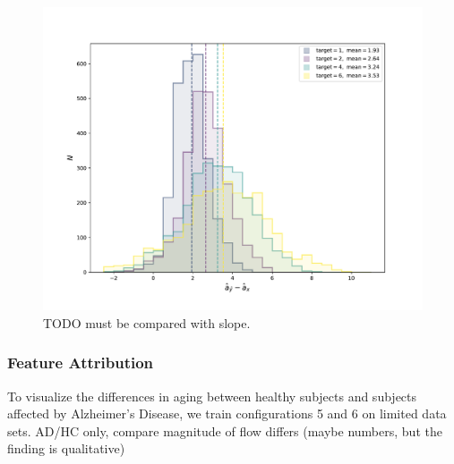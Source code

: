 \begin{figure}
	\centering
	\includegraphics[width=\linewidth]{images/age_plots/hist_fixed}
	\vspace*{-15pt}
	\caption{TODO must be compared with slope.}
	\label{fig:expfixedhist}
\end{figure}

\subsubsection*{Feature Attribution}
To visualize the differences in aging between healthy subjects and subjects affected by Alzheimer's Disease, we train configurations 5 and 6 on limited data sets.
AD/HC only, compare
magnitude of flow differs (maybe numbers, but the finding is qualitative)

